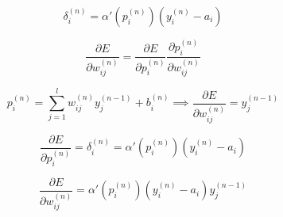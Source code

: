 \documentclass[ignorenonframetext,]{beamer}
\begin{document}
\begin{frame}{}

\[ \delta_i^{(n)} = \alpha'(p_i^{(n)}) (y_i^{(n)} - a_i) \]

\[ \frac{\partial{E}}{\partial{w_{ij}^{(n)}}} = \frac{\partial{E}}{\partial{p_i^{(n)}}} \frac{\partial{p_i^{(n)}}}{\partial{w_{ij}^{(n)}}} \]

\[ p_i^{(n)} = \sum_{j=1}^l w_{ij}^{(n)} y_j^{(n-1)} + b_i^{(n)} \implies \frac{\partial{E}}{\partial{w_{ij}^{(n)}}} = y_j^{(n-1)} \]

\[ \frac{\partial{E}}{\partial{p_i^{(n)}}} = \delta_i^{(n)} = \alpha'(p_i^{(n)}) (y_i^{(n)} - a_i) \]

\[ \frac{\partial{E}}{\partial{w_{ij}^{(n)}}} = \alpha'(p_i^{(n)}) (y_i^{(n)} - a_i) y_j^{(n-1)} \]

\end{frame}
\end{document}
